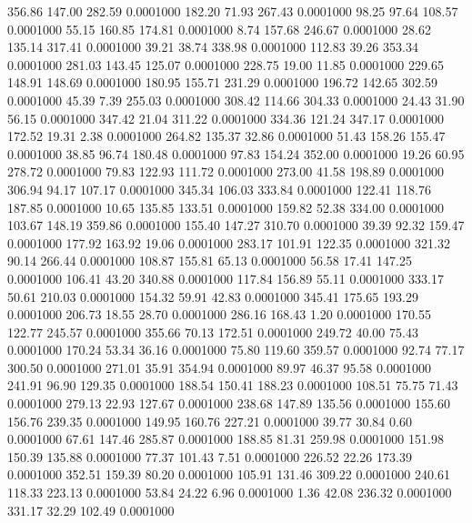  356.86  147.00  282.59   0.0001000
 182.20   71.93  267.43   0.0001000
  98.25   97.64  108.57   0.0001000
  55.15  160.85  174.81   0.0001000
   8.74  157.68  246.67   0.0001000
  28.62  135.14  317.41   0.0001000
  39.21   38.74  338.98   0.0001000
 112.83   39.26  353.34   0.0001000
 281.03  143.45  125.07   0.0001000
 228.75   19.00   11.85   0.0001000
 229.65  148.91  148.69   0.0001000
 180.95  155.71  231.29   0.0001000
 196.72  142.65  302.59   0.0001000
  45.39    7.39  255.03   0.0001000
 308.42  114.66  304.33   0.0001000
  24.43   31.90   56.15   0.0001000
 347.42   21.04  311.22   0.0001000
 334.36  121.24  347.17   0.0001000
 172.52   19.31    2.38   0.0001000
 264.82  135.37   32.86   0.0001000
  51.43  158.26  155.47   0.0001000
  38.85   96.74  180.48   0.0001000
  97.83  154.24  352.00   0.0001000
  19.26   60.95  278.72   0.0001000
  79.83  122.93  111.72   0.0001000
 273.00   41.58  198.89   0.0001000
 306.94   94.17  107.17   0.0001000
 345.34  106.03  333.84   0.0001000
 122.41  118.76  187.85   0.0001000
  10.65  135.85  133.51   0.0001000
 159.82   52.38  334.00   0.0001000
 103.67  148.19  359.86   0.0001000
 155.40  147.27  310.70   0.0001000
  39.39   92.32  159.47   0.0001000
 177.92  163.92   19.06   0.0001000
 283.17  101.91  122.35   0.0001000
 321.32   90.14  266.44   0.0001000
 108.87  155.81   65.13   0.0001000
  56.58   17.41  147.25   0.0001000
 106.41   43.20  340.88   0.0001000
 117.84  156.89   55.11   0.0001000
 333.17   50.61  210.03   0.0001000
 154.32   59.91   42.83   0.0001000
 345.41  175.65  193.29   0.0001000
 206.73   18.55   28.70   0.0001000
 286.16  168.43    1.20   0.0001000
 170.55  122.77  245.57   0.0001000
 355.66   70.13  172.51   0.0001000
 249.72   40.00   75.43   0.0001000
 170.24   53.34   36.16   0.0001000
  75.80  119.60  359.57   0.0001000
  92.74   77.17  300.50   0.0001000
 271.01   35.91  354.94   0.0001000
  89.97   46.37   95.58   0.0001000
 241.91   96.90  129.35   0.0001000
 188.54  150.41  188.23   0.0001000
 108.51   75.75   71.43   0.0001000
 279.13   22.93  127.67   0.0001000
 238.68  147.89  135.56   0.0001000
 155.60  156.76  239.35   0.0001000
 149.95  160.76  227.21   0.0001000
  39.77   30.84    0.60   0.0001000
  67.61  147.46  285.87   0.0001000
 188.85   81.31  259.98   0.0001000
 151.98  150.39  135.88   0.0001000
  77.37  101.43    7.51   0.0001000
 226.52   22.26  173.39   0.0001000
 352.51  159.39   80.20   0.0001000
 105.91  131.46  309.22   0.0001000
 240.61  118.33  223.13   0.0001000
  53.84   24.22    6.96   0.0001000
   1.36   42.08  236.32   0.0001000
 331.17   32.29  102.49   0.0001000
